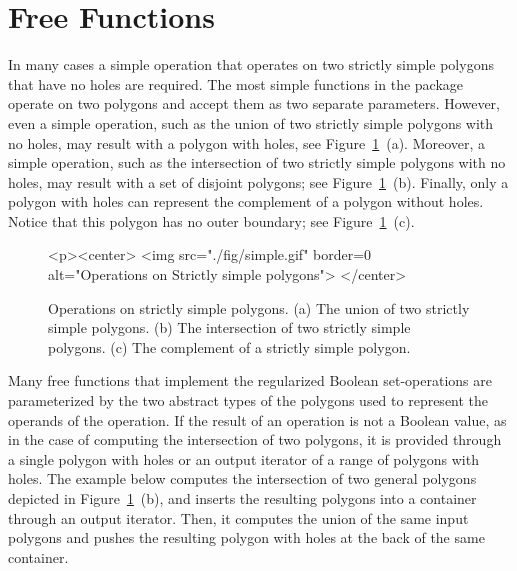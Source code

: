 \section{Free Functions}
\label{bso_sec:free_functions}
In many cases a simple operation that operates on two strictly simple
polygons that have no holes are required. The most simple functions in
the package operate on two polygons and accept them as two separate
parameters. However, even a simple operation, such as the union of two
strictly simple polygons with no holes, may result with a polygon with
holes, see Figure~\ref{fig:simple}~(a). Moreover, a simple operation,
such as the intersection of two strictly simple polygons with no holes, 
may result with a set of disjoint polygons; see
Figure~\ref{fig:simple}~(b). Finally, only a polygon with holes can
represent the complement of a polygon without holes. Notice that this
polygon has no outer boundary; see Figure~\ref{fig:simple}~(c).

\begin{figure}[!htp]
\begin{ccTexOnly}

\end{ccTexOnly}
\begin{ccHtmlOnly}
  <p><center>
    <img src="./fig/simple.gif" border=0 alt="Operations on Strictly
    simple polygons">
  </center>
\end{ccHtmlOnly}
\caption{\label{fig:simple}Operations on strictly simple polygons. (a) The union of two
strictly simple polygons. (b) The intersection of two strictly simple
polygons. (c) The complement of a strictly simple polygon.} 
\end{figure}

Many free functions that implement the regularized Boolean 
set-operations are parameterized by the two abstract types of the polygons 
used to represent the operands of the operation. If the result of an 
operation is not a Boolean value, as in the case of computing the 
intersection of two polygons, it is provided through a single polygon with 
holes or an output iterator of a range of polygons with holes. The example
below computes the intersection of two general polygons depicted in 
Figure~\ref{fig:simple}~(b), and inserts the resulting polygons into a 
container through an output iterator. Then, it computes the union of the
same input polygons and pushes the resulting polygon with holes at the
back of the same container. 

